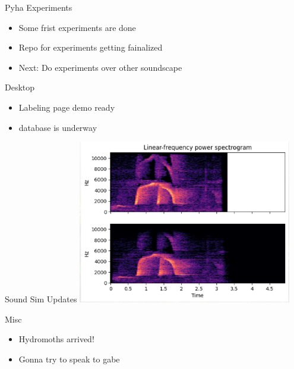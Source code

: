 \begin{frame}{Pyha Experiments}
    \begin{itemize}
        \item Some frist experiments are done
        \item Repo for experiments getting fainalized
        \item Next: Do experiments over other soundscape
    \end{itemize}    
\end{frame}

\begin{frame}{Desktop}
    \begin{itemize}
        \item Labeling page demo ready
        \item database is underway
    \end{itemize}    
\end{frame}

\begin{frame}{Sound Sim Updates}
    \centering
    \includegraphics[height=0.7\textheight,width=0.7\textwidth,keepaspectratio]{images/soundsim_demo.png}
\end{frame}

\begin{frame}{Misc}
    \begin{itemize}
        \item Hydromoths arrived!
        \item Gonna try to speak to gabe
    \end{itemize}    
\end{frame}


